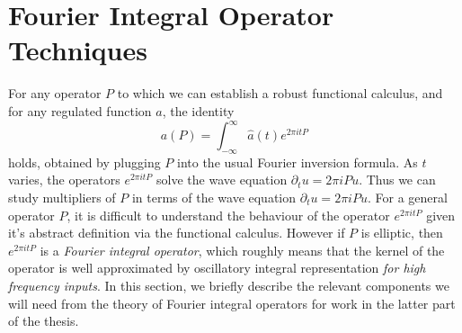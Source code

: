 
\section{Fourier Integral Operator Techniques}

For any operator $P$ to which we can establish a robust functional calculus, and for any regulated function $a$, the identity
%
\[ a(P) = \int_{-\infty}^\infty \widehat{a}(t) e^{2 \pi itP} \]
%
holds, obtained by plugging $P$ into the usual Fourier inversion formula. As $t$ varies, the operators $e^{2 \pi itP}$ solve the wave equation $\partial_t u = 2 \pi i P u$. Thus we can study multipliers of $P$ in terms of the wave equation $\partial_t u = 2 \pi i P u$. For a general operator $P$, it is difficult to understand the behaviour of the operator $e^{2 \pi i t P}$ given it's abstract definition via the functional calculus. However if $P$ is elliptic, then $e^{2 \pi i t P}$ is a \emph{Fourier integral operator}, which roughly means that the kernel of the operator is well approximated by oscillatory integral representation \emph{for high frequency inputs}. In this section, we briefly describe the relevant components we will need from the theory of Fourier integral operators for work in the latter part of the thesis.

